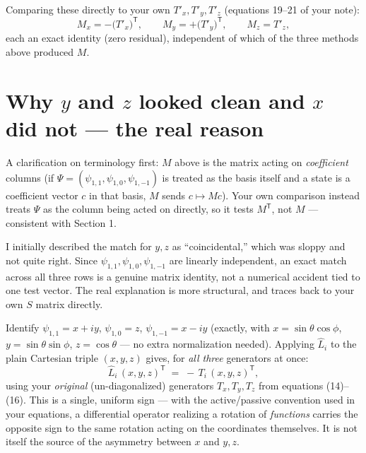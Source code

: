 \documentclass[11pt]{article}
\begin{document}
Comparing these directly to your own $T'_x, T'_y, T'_z$ (equations 19--21
of your note):
\[
  M_x = -\big(T'_x\big)^{\mathsf T}, \qquad
  M_y = +\big(T'_y\big)^{\mathsf T}, \qquad
  M_z = T'_z ,
\]
each an exact identity (zero residual), independent of which of the three
methods above produced $M$.

\section{Why $y$ and $z$ looked clean and $x$ did not --- the real reason}

A clarification on terminology first: $M$ above is the matrix acting on
\emph{coefficient} columns (if $\Psi=(\psi_{1,1},\psi_{1,0},\psi_{1,-1})$ is
treated as the basis itself and a state is a coefficient vector $c$ in that
basis, $M$ sends $c\mapsto Mc$). Your own comparison instead treats
$\Psi$ as the column being acted on directly, so it tests $M^{\mathsf T}$,
not $M$ --- consistent with Section 1.

I initially described the match for $y,z$ as ``coincidental,'' which was
sloppy and not quite right. Since $\psi_{1,1},\psi_{1,0},\psi_{1,-1}$ are
linearly independent, an exact match across all three rows is a genuine
matrix identity, not a numerical accident tied to one test vector. The
real explanation is more structural, and traces back to your own $S$
matrix directly.

Identify $\psi_{1,1}=x+iy$, $\psi_{1,0}=z$, $\psi_{1,-1}=x-iy$ (exactly,
with $x=\sin\theta\cos\phi$, $y=\sin\theta\sin\phi$, $z=\cos\theta$ --- no
extra normalization needed). Applying $\hat L_i$ to the plain Cartesian
triple $(x,y,z)$ gives, for \emph{all three} generators at once:
\[
  \hat L_i\,(x,y,z)^{\mathsf T} \;=\; -\,T_i\,(x,y,z)^{\mathsf T},
\]
using your \emph{original} (un-diagonalized) generators $T_x,T_y,T_z$ from
equations (14)--(16). This is a single, uniform sign --- with the
active/passive convention used in your equations, a differential operator
realizing a rotation of \emph{functions} carries the opposite sign to the
same rotation acting on the coordinates themselves. It is not itself the
source of the asymmetry between $x$ and $y,z$.
\end{document}
